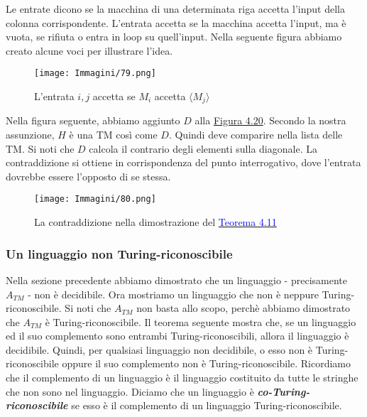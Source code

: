 \documentclass{article}
\begin{document}
Le entrate dicono se la macchina di una determinata riga accetta l'input della colonna corrispondente.
L'entrata accetta se la macchina accetta l'input, ma è vuota, se rifiuta o entra in loop su quell'input.
Nella seguente figura abbiamo creato alcune voci per illustrare l'idea.
\begin{figure}[H]
    \centering
    \texttt{[image: Immagini/79.png]}
    \caption{L'entrata $i,j$ accetta se $M_i$ accetta $\langle M_j \rangle$}
    \label{figura-4.20} 
\end{figure}
Nella figura seguente, abbiamo aggiunto $D$ alla \hyperref[figura-4.20]{Figura 4.20}.
Secondo la nostra assunzione, $H$ è una TM così come $D$.
Quindi deve comparire nella lista delle TM.
Si noti che $D$ calcola il contrario degli elementi sulla diagonale.
La contraddizione si ottiene in corrispondenza del punto interrogativo, dove l'entrata dovrebbe essere l'opposto di se stessa.
\begin{figure}[H]
    \centering
    \texttt{[image: Immagini/80.png]}
    \caption{La contraddizione nella dimostrazione del \hyperref[teorema-4.11]{\textcolor{blue}{Teorema 4.11}}}
    \label{figura-4.21}
\end{figure}

\subsubsection{Un linguaggio non Turing-riconoscibile}
Nella sezione precedente abbiamo dimostrato che un linguaggio - precisamente $A_{TM}$ - non è decidibile.
Ora mostriamo un linguaggio che non è neppure Turing-riconoscibile.
Si noti che $A_{TM}$ non basta allo scopo, perchè abbiamo dimostrato che $A_{TM}$ è Turing-riconoscibile.
Il teorema seguente mostra che, se un linguaggio ed il suo complemento sono entrambi Turing-riconoscibili, allora il linguaggio è decidibile.
Quindi, per qualsiasi linguaggio non decidibile, o esso non è Turing-riconoscibile oppure il suo complemento non è Turing-riconoscibile.
Ricordiamo che il complemento di un linguaggio è il linguaggio costituito da tutte le stringhe che non sono nel linguaggio.
Diciamo che un linguaggio è \textbf{\textit{co-Turing-riconoscibile}} se esso è il complemento di un linguaggio Turing-riconoscibile.
\end{document}
